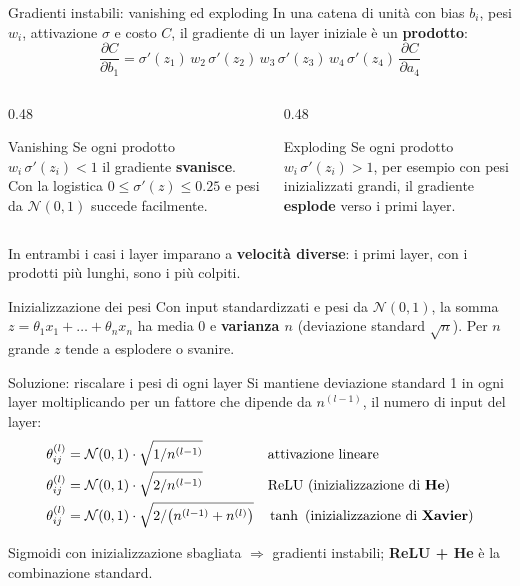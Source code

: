 \documentclass[aspectratio=169]{beamer}
\begin{document}
\begin{frame}{Gradienti instabili: vanishing ed exploding}
  In una catena di unità con bias $b_i$, pesi $w_i$, attivazione $\sigma$ e
  costo $C$, il gradiente di un layer iniziale è un \textbf{prodotto}:
  \[ \frac{\partial C}{\partial b_1} = \sigma'(z_1)\, w_2\, \sigma'(z_2)\,
     w_3\, \sigma'(z_3)\, w_4\, \sigma'(z_4)\, \frac{\partial C}{\partial a_4} \]
  \begin{columns}[T]
    \begin{column}{0.48\textwidth}
      \begin{block}{Vanishing}
        Se ogni prodotto $w_i\,\sigma'(z_i) < 1$ il gradiente \textbf{svanisce}.
        Con la logistica $0 \le \sigma'(z) \le 0.25$ e pesi da
        $\mathcal{N}(0,1)$ succede facilmente.
      \end{block}
    \end{column}
    \begin{column}{0.48\textwidth}
      \begin{block}{Exploding}
        Se ogni prodotto $w_i\,\sigma'(z_i) > 1$, per esempio con pesi
        inizializzati grandi, il gradiente \textbf{esplode} verso i primi layer.
      \end{block}
    \end{column}
  \end{columns}
  \vspace{0.2cm}
  In entrambi i casi i layer imparano a \textbf{velocità diverse}: i primi
  layer, con i prodotti più lunghi, sono i più colpiti.
\end{frame}

\begin{frame}{Inizializzazione dei pesi}
  \small
  Con input standardizzati e pesi da $\mathcal{N}(0,1)$, la somma
  $z = \theta_1x_1 + \dots + \theta_nx_n$ ha media 0 e \textbf{varianza $n$}
  (deviazione standard $\sqrt{n}$). Per $n$ grande $z$ tende a esplodere o
  svanire.
  \begin{block}{Soluzione: riscalare i pesi di ogni layer}
    Si mantiene deviazione standard 1 in ogni layer moltiplicando per un
    fattore che dipende da $n^{(l-1)}$, il numero di input del layer:
    \begin{align*}
      \theta_{ij}^{(l)} &= \mathcal{N}(0,1)\cdot\sqrt{1/n^{(l-1)}}
        && \text{attivazione lineare} \\
      \theta_{ij}^{(l)} &= \mathcal{N}(0,1)\cdot\sqrt{2/n^{(l-1)}}
        && \text{ReLU (inizializzazione di \textbf{He})} \\
      \theta_{ij}^{(l)} &= \mathcal{N}(0,1)\cdot\sqrt{2/\big(n^{(l-1)}+n^{(l)}\big)}
        && \tanh\ \text{(inizializzazione di \textbf{Xavier})}
    \end{align*}
  \end{block}
  Sigmoidi con inizializzazione sbagliata $\Rightarrow$ gradienti instabili;
  \textbf{ReLU + He} è la combinazione standard.
\end{frame}
\end{document}
